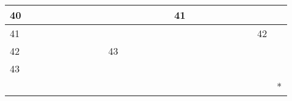 \documentclass{article}
\begin{document}
\begin{table}[!ht]
\begin{adjustbox}{max width=\textwidth}
\begin{tabular}{|l|l|l|l|l|l|l|l|l|l|l|l|l|l|l|l|l|}
				40 & ~ & ~ & ~ & ~ & ~ & ~ & ~ & ~ & ~ & 41 & ~ & ~ & ~ & ~ & ~ & ~ \\ \hline
				41 & ~ & ~ & ~ & ~ & ~ & ~ & ~ & ~ & ~ & ~ & ~ & ~ & ~ & ~ & 42 & ~ \\ \hline
				42 & ~ & ~ & ~ & ~ & ~ & 43 & ~ & ~ & ~ & ~ & ~ & ~ & ~ & ~ & ~ & ~ \\ \hline
				43 & ~ & ~ & ~ & ~ & ~ & ~ & ~ & ~ & ~ & ~ & ~ & ~ & ~ & ~ & ~ & ~ \\ \hline
				~ & ~ & ~ & ~ & ~ & ~ & ~ & ~ & ~ & ~ & ~ & ~ & ~ & ~ & ~ & ~ & * \\ \hline
			\end{tabular}
		\end{adjustbox}
	\end{table}
\end{document}
